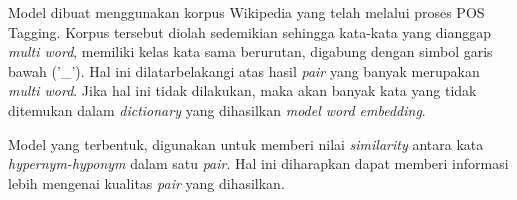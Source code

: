 Model dibuat menggunakan korpus Wikipedia yang telah melalui proses POS Tagging. Korpus tersebut diolah sedemikian sehingga kata-kata yang dianggap \textit{multi word}, memiliki kelas kata sama berurutan, digabung dengan simbol garis bawah ('\_'). Hal ini dilatarbelakangi atas hasil \textit{pair} yang banyak merupakan \textit{multi word}. Jika hal ini tidak dilakukan, maka akan banyak kata yang tidak ditemukan dalam \textit{dictionary} yang dihasilkan \textit{model word embedding}.

Model yang terbentuk, digunakan untuk memberi nilai \textit{similarity} antara kata \textit{hypernym-hyponym} dalam satu \textit{pair}. Hal ini diharapkan dapat memberi informasi lebih mengenai kualitas \textit{pair} yang dihasilkan.
